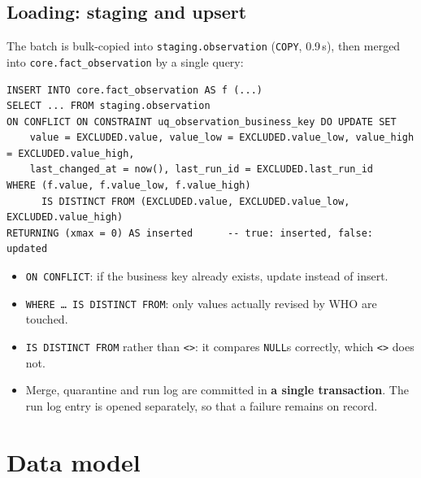 \documentclass[11pt, a4paper, oneside, headings=normal, numbers=noenddot, DIV=12]{scrartcl}
\begin{document}
\subsection{Loading: staging and upsert}
The batch is bulk-copied into \texttt{staging.}\allowbreak\texttt{observation} (\texttt{COPY}, 0.9\,s), then merged into \texttt{core.}\allowbreak\texttt{fact\_observation} by
a single query:

\begin{lstlisting}[language=DuckSQL]
INSERT INTO core.fact_observation AS f (...)
SELECT ... FROM staging.observation
ON CONFLICT ON CONSTRAINT uq_observation_business_key DO UPDATE SET
    value = EXCLUDED.value, value_low = EXCLUDED.value_low, value_high = EXCLUDED.value_high,
    last_changed_at = now(), last_run_id = EXCLUDED.last_run_id
WHERE (f.value, f.value_low, f.value_high)
      IS DISTINCT FROM (EXCLUDED.value, EXCLUDED.value_low, EXCLUDED.value_high)
RETURNING (xmax = 0) AS inserted      -- true: inserted, false: updated
\end{lstlisting}

\begin{itemize}[leftmargin=1.2em]
  \item \texttt{ON CONFLICT}: if the business key already exists, update instead of insert.
  \item \texttt{WHERE … IS DISTINCT FROM}: only values actually revised by WHO are touched.
  \item \texttt{IS DISTINCT FROM} rather than \texttt{<>}: it compares \texttt{NULL}s correctly, which \texttt{<>} does not.
  \item Merge, quarantine and run log are committed in \textbf{a single transaction}. The run log entry is opened separately, so that a failure
        remains on record.
\end{itemize}

\section{Data model}
\end{document}
